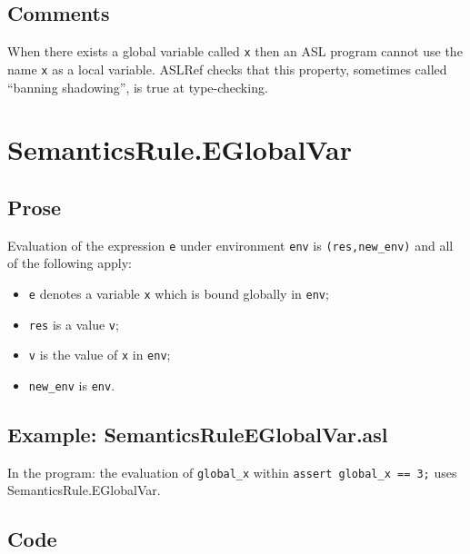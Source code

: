 \documentclass{book}
\begin{document}
  \subsection{Comments}
  When there exists a global variable called \texttt{x} then an ASL program
  cannot use the name \texttt{x} as a local variable. ASLRef checks that this
  property, sometimes called ``banning shadowing'', is true at type-checking.

\section{SemanticsRule.EGlobalVar \label{sec:SemanticsRule.EGlobalVar}}

  \subsection{Prose}
  Evaluation of the expression \texttt{e} under environment \texttt{env} is
  \texttt{(res,new\_env)} and all of the following apply:
  \begin{itemize}
  \item \texttt{e} denotes a variable \texttt{x} which is bound globally in \texttt{env};
  \item \texttt{res} is a value \texttt{v};
  \item \texttt{v} is the value of \texttt{x} in \texttt{env};
  \item \texttt{new\_env} is \texttt{env}.
  \end{itemize}

  \subsection{Example: SemanticsRuleEGlobalVar.asl}
    In the program:
    the evaluation of \texttt{global\_x} within \texttt{assert global\_x == 3;}
    uses SemanticsRule.EGlobalVar.


  \subsection{Code}
\end{document}
